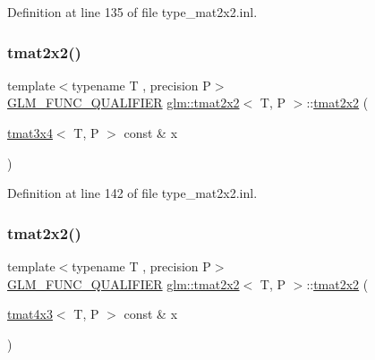 Definition at line 135 of file type\+\_\+mat2x2.\+inl.

\mbox{\label{structglm_1_1tmat2x2_abb5235dd0bc0f2aced04e5dcba22e040}} 
\subsubsection{\texorpdfstring{tmat2x2()}{tmat2x2()}\hspace{0.1cm}{\footnotesize\ttfamily [17/22]}}
{\footnotesize\ttfamily template$<$typename T , precision P$>$ \\
\mbox{\hyperlink{setup_8hpp_a33fdea6f91c5f834105f7415e2a64407}{G\+L\+M\+\_\+\+F\+U\+N\+C\+\_\+\+Q\+U\+A\+L\+I\+F\+I\+ER}} \mbox{\hyperlink{structglm_1_1tmat2x2}{glm\+::tmat2x2}}$<$ T, P $>$\+::\mbox{\hyperlink{structglm_1_1tmat2x2}{tmat2x2}} (\begin{DoxyParamCaption}\item[{\mbox{\hyperlink{structglm_1_1tmat3x4}{tmat3x4}}$<$ T, P $>$ const \&}]{x }\end{DoxyParamCaption})}



Definition at line 142 of file type\+\_\+mat2x2.\+inl.

\mbox{\label{structglm_1_1tmat2x2_a66947436834c7b463eb5d08c5aa6ef19}} 
\subsubsection{\texorpdfstring{tmat2x2()}{tmat2x2()}\hspace{0.1cm}{\footnotesize\ttfamily [18/22]}}
{\footnotesize\ttfamily template$<$typename T , precision P$>$ \\
\mbox{\hyperlink{setup_8hpp_a33fdea6f91c5f834105f7415e2a64407}{G\+L\+M\+\_\+\+F\+U\+N\+C\+\_\+\+Q\+U\+A\+L\+I\+F\+I\+ER}} \mbox{\hyperlink{structglm_1_1tmat2x2}{glm\+::tmat2x2}}$<$ T, P $>$\+::\mbox{\hyperlink{structglm_1_1tmat2x2}{tmat2x2}} (\begin{DoxyParamCaption}\item[{\mbox{\hyperlink{structglm_1_1tmat4x3}{tmat4x3}}$<$ T, P $>$ const \&}]{x }\end{DoxyParamCaption})}



